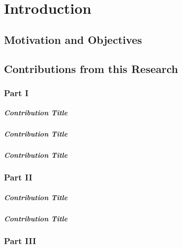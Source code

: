\chapter{Introduction}
\lipsum[2-4]

\section{Motivation and Objectives}
\lipsum[1-2]

\section{Contributions from this Research}
\lipsum[1]

\subsection{Part I}
\lipsum[66]

\paragraph{Contribution Title}
\Blindtext[1][1]

\paragraph{Contribution Title}
\Blindtext[1][1]

\paragraph{Contribution Title}
\Blindtext[1][1]

\subsection{Part II}
\lipsum[66]

\paragraph{Contribution Title}
\lipsum[1]

\paragraph{Contribution Title}
\lipsum[1]

\subsection{Part III}
\lipsum[75]

